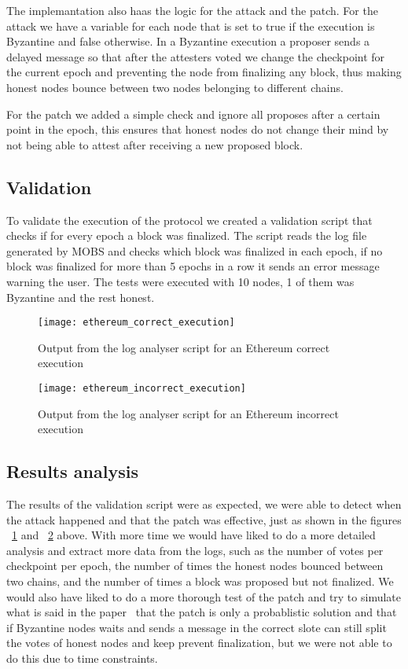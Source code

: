 The implemantation also haas the logic for the attack and the patch. For the attack we have a variable for each node that is set to true
if the execution is Byzantine and false otherwise. In a Byzantine execution a proposer sends a delayed message so that after the attesters
voted we change the checkpoint for the current epoch and preventing the node from finalizing any block, thus making honest nodes bounce between
two nodes belonging to different chains.

For the patch we added a simple check and ignore all proposes after a certain point in the epoch, this ensures that honest nodes do not change their mind
by not being able to attest after receiving a new proposed block.


\subsection{Validation}\label{sub:validation}

To validate the execution of the protocol we created a validation script that checks if for every epoch a block was finalized.
The script reads the log file generated by MOBS and checks which block was finalized in each epoch, if no block was finalized
for more than 5 epochs in a row it sends an error message warning the user.
The tests were executed with 10 nodes, 1 of them was Byzantine and the rest honest.

\begin{figure}[h]
	\centering
	\texttt{[image: ethereum\_correct\_execution]}
	\caption{Output from the log analyser script for an Ethereum correct execution}
	\label{fig:ethereum_correct_execution}
\end{figure}

\begin{figure}[h]
	\centering
	\texttt{[image: ethereum\_incorrect\_execution]}
	\caption{Output from the log analyser script for an Ethereum incorrect execution}
	\label{fig:ethereum_incorrect_execution}
\end{figure}

\subsection{Results analysis}\label{sub:result_analysis}

The results of the validation script were as expected, we were able to detect when the attack happened and that the patch was effective,
just as shown in the figures ~\ref{fig:ethereum_correct_execution} and ~\ref{fig:ethereum_incorrect_execution} above. With more time we would have liked to
do a more detailed analysis and extract more data from the logs, such as the number of votes per checkpoint per epoch, the number of times
the honest nodes bounced between two chains, and the number of times a block was proposed but not finalized.
We would also have liked to do a more thorough test of the patch and try to simulate what is said in the paper~\cite{ethereum_analysis} that
the patch is only a probablistic solution and that if Byzantine nodes waits and sends a message in the correct slote can still split the votes of honest nodes
and keep prevent finalization, but we were not able to do this due to time constraints.